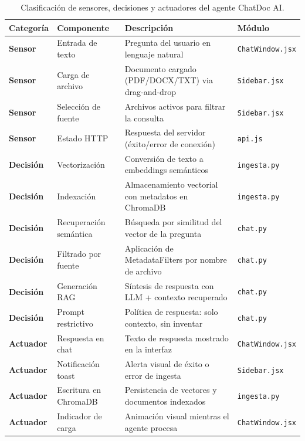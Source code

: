 \documentclass[12pt,a4paper]{article}
\begin{document}
\begin{table}[H]
\centering
\renewcommand{\arraystretch}{1.4}
\begin{tabular}{>{\bfseries}p{2.6cm} p{3.8cm} p{5cm} p{2.8cm}}
\toprule
\textbf{Categoría} & \textbf{Componente} & \textbf{Descripción} & \textbf{Módulo} \\
\midrule
\rowcolor{teal!10}
Sensor & Entrada de texto & Pregunta del usuario en lenguaje natural & \texttt{ChatWindow.jsx} \\
\rowcolor{teal!10}
Sensor & Carga de archivo & Documento cargado (PDF/DOCX/TXT) via drag-and-drop & \texttt{Sidebar.jsx} \\
\rowcolor{teal!10}
Sensor & Selección de fuente & Archivos activos para filtrar la consulta & \texttt{Sidebar.jsx} \\
\rowcolor{teal!10}
Sensor & Estado HTTP & Respuesta del servidor (éxito/error de conexión) & \texttt{api.js} \\
\midrule
\rowcolor{emerald!10}
Decisión & Vectorización & Conversión de texto a embeddings semánticos & \texttt{ingesta.py} \\
\rowcolor{emerald!10}
Decisión & Indexación & Almacenamiento vectorial con metadatos en ChromaDB & \texttt{ingesta.py} \\
\rowcolor{emerald!10}
Decisión & Recuperación semántica & Búsqueda por similitud del vector de la pregunta & \texttt{chat.py} \\
\rowcolor{emerald!10}
Decisión & Filtrado por fuente & Aplicación de MetadataFilters por nombre de archivo & \texttt{chat.py} \\
\rowcolor{emerald!10}
Decisión & Generación RAG & Síntesis de respuesta con LLM + contexto recuperado & \texttt{chat.py} \\
\rowcolor{emerald!10}
Decisión & Prompt restrictivo & Política de respuesta: solo contexto, sin inventar & \texttt{chat.py} \\
\midrule
\rowcolor{orange!10}
Actuador & Respuesta en chat & Texto de respuesta mostrado en la interfaz & \texttt{ChatWindow.jsx} \\
\rowcolor{orange!10}
Actuador & Notificación toast & Alerta visual de éxito o error de ingesta & \texttt{Sidebar.jsx} \\
\rowcolor{orange!10}
Actuador & Escritura en ChromaDB & Persistencia de vectores y documentos indexados & \texttt{ingesta.py} \\
\rowcolor{orange!10}
Actuador & Indicador de carga & Animación visual mientras el agente procesa & \texttt{ChatWindow.jsx} \\
\bottomrule
\end{tabular}
\caption{Clasificación de sensores, decisiones y actuadores del agente ChatDoc AI.}
\label{tab:sda}
\end{table}
\end{document}
